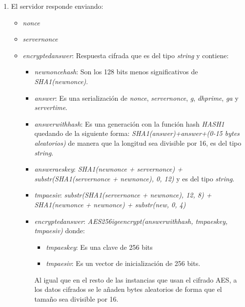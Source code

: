 \begin{enumerate}
	\item El servidor responde enviando:
		\begin{itemize}
			\item \emph{nonce}
			\item \emph{server\textunderscore nonce}
			\item \emph{encrypted\textunderscore answer}: Respuesta cifrada que es del tipo \emph{string} y contiene:
			\begin{itemize}
				\item \emph{new\textunderscore nonce\textunderscore hash}: Son los 128 bits menos significativos de \emph{SHA1(new\textunderscore nonce)}.
				\item \emph{answer}: Es una serialización de \emph{nonce}, \emph{server\textunderscore nonce}, \emph{g}, \emph{dh\textunderscore prime}, \emph{g\textunderscore a} y \emph{server\textunderscore time}.
				\item \emph{answer\textunderscore with\textunderscore hash}: Es una generación con la función hash \emph{HASH1} quedando de la siguiente forma: \emph{SHA1(answer)+answer+(0-15 bytes aleatorios)} de manera que la longitud sea divisible por 16, es del tipo \emph{string}.
				\item \emph{answer\textunderscore aes\textunderscore key}: \emph{SHA1(new\textunderscore nonce + server\textunderscore nonce) + substr(SHA1(server\textunderscore nonce + new\textunderscore nonce), 0, 12)} y es del tipo \emph{string}.
				\item \emph{tmp\textunderscore aes\textunderscore iv}: \emph{substr(SHA1(server\textunderscore nonce + new\textunderscore nonce), 12, 8) + SHA1(new\textunderscore nonce + new\textunderscore nonce) + substr(new\textunderscore, 0, 4)}
				\item \emph{encrypted\textunderscore answer}: \emph{AES256\textunderscore ige\textunderscore encrypt(answer\textunderscore with\textunderscore hash, tmp\textunderscore aes\textunderscore key, tmp\textunderscore aes\textunderscore iv)} donde:
				\begin{itemize}
					\item \emph{tmp\textunderscore aes\textunderscore key}: Es una clave de 256 bits
					\item \emph{tmp\textunderscore aes\textunderscore iv}: Es un vector de inicialización de 256 bits.
				\end{itemize}
				Al igual que en el resto de las instancias que usan el cifrado AES, a los datos cifrados se le añaden bytes aleatorios de forma que el tamaño sea divisible por 16.

\end{itemize}
\end{itemize}
\end{enumerate}
